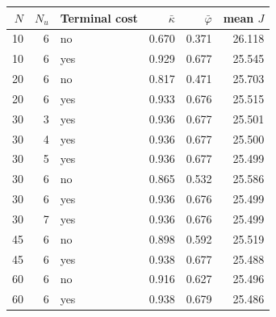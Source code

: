 \begin{tabular}{rrlrrr}
\toprule
$N$ & $N_u$ & Terminal cost & $\bar\kappa$ & $\bar\varphi$ & mean $J$\\
\midrule
10 & 6 & no & 0.670 & 0.371 & 26.118\\
10 & 6 & yes & 0.929 & 0.677 & 25.545\\
20 & 6 & no & 0.817 & 0.471 & 25.703\\
20 & 6 & yes & 0.933 & 0.676 & 25.515\\
30 & 3 & yes & 0.936 & 0.677 & 25.501\\
30 & 4 & yes & 0.936 & 0.677 & 25.500\\
30 & 5 & yes & 0.936 & 0.677 & 25.499\\
30 & 6 & no & 0.865 & 0.532 & 25.586\\
30 & 6 & yes & 0.936 & 0.676 & 25.499\\
30 & 7 & yes & 0.936 & 0.676 & 25.499\\
45 & 6 & no & 0.898 & 0.592 & 25.519\\
45 & 6 & yes & 0.938 & 0.677 & 25.488\\
60 & 6 & no & 0.916 & 0.627 & 25.496\\
60 & 6 & yes & 0.938 & 0.679 & 25.486\\
\bottomrule
\end{tabular}
